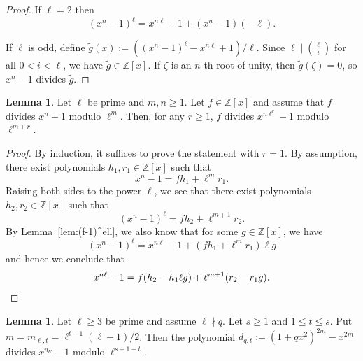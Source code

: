 \documentclass[10pt]{article}
\theoremstyle{definition}
\newtheorem{lemma}[theorem]{Lemma}
\renewcommand{\:}{\colon}
\begin{document}
\begin{proof}
    If $\ell=2$ then 
    \[
        (x^n-1)^{\ell} = x^{n\ell} - 1 + (x^{n}-1)(-\ell).
    \]
    
    If $\ell$ is odd, define $\tilde{g}(x) := \left( (x^n-1)^{\ell} - x^{n\ell} + 1 \right)/\ell$. Since $\ell \mid \binom{\ell}{i}$ for all $0 < i < \ell$, we have $\tilde{g} \in \mathbb Z[x]$. If $\zeta$ is an $n$-th root of unity, then $\tilde{g}(\zeta) = 0$, so $x^n-1$ divides $\tilde{g}$. 
\end{proof}

\begin{lemma}\label{lem:div_upgrade}
    Let $\ell$ be prime and $m,n \geq 1$. Let $f \in \mathbb Z[x]$ and assume that $f$ divides $x^n - 1$ modulo $\ell^m$. Then, for any $r \geq 1$, $f$ divides $x^{n \ell^r} - 1$ modulo $\ell^{m+r}$.
\end{lemma}

\begin{proof}
    By induction, it suffices to prove the statement with $r = 1$. By assumption, there exist polynomials $h_1, r_1 \in \mathbb Z[x]$ such that
    \[
    x^n-1 = fh_1 + \ell^{m} r_1.
    \]
    Raising both sides to the power $\ell$, we see that there exist polynomials $h_2, r_2 \in \mathbb Z[x]$ such that
    \[
    (x^n-1)^{\ell} = fh_2 + \ell^{m+1}r_2.
    \]
    By Lemma~\ref{lem:(f-1)^ell}, we also know that for some $g \in \mathbb Z[x]$, we have
    \[
    (x^n-1)^{\ell} = x^{n\ell} - 1 + (fh_1 + \ell^{m} r_1)\ell g
    \]
    and hence we conclude that
    \[
    x^{n\ell}-1 = f(h_2 - h_1 \ell g) + \ell^{m+1}(r_2 -r_1g). \qedhere
    \]
\end{proof}

\begin{lemma}\label{lem:denom_divisible}
     Let $\ell \geq 3$ be prime and assume $\ell \nmid q$.
     Let $s \geq 1$ and $1 \leq t \leq s$. Put $m = m_{\ell,t} = \ell^{t-1}(\ell-1)/2$. Then the polynomial $d_{q,t} := (1+qx^2)^{2m} - x^{2m}$ divides $x^{n_{U}}-1$ modulo $\ell^{s+1-t}$.
\end{lemma}
\end{document}
